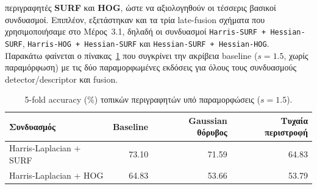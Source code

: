 \documentclass[12pt, a4paper]{article}
\begin{document}
περιγραφητές \textbf{SURF} και \textbf{HOG}, ώστε να αξιολογηθούν οι τέσσερις
βασικοί συνδυασμοί. Επιπλέον, εξετάστηκαν και τα τρία late-fusion σχήματα που
χρησιμοποιήσαμε στο Μέρος~3.1, δηλαδή οι συνδυασμοί
\texttt{Harris-SURF + Hessian-SURF},
\texttt{Harris-HOG + Hessian-SURF} και
\texttt{Hessian-SURF + Hessian-HOG}.\\
Παρακάτω φαίνεται ο πίνακας~\ref{tab:robustness_local} που συγκρίνει την ακρίβεια baseline
($s{=}1.5$, χωρίς παραμόρφωση) με τις δύο παραμορφωμένες εκδόσεις για
όλους τους συνδυασμούς detector/descriptor και fusion. 
 \begin{table}[H]                                                                                                                                                                 
      \centering                                                                                                                                                                   
      \small                                                                                                                                                                       
      \caption{5-fold accuracy (\%) τοπικών περιγραφητών υπό παραμορφώσεις ($s=1.5$).}                                                                                             
      \label{tab:robustness_local}                                                                                                                                                 
      \begin{tabular}{lrrr}                                                                                                                                                        
          \hline                                                                                                                                                                   
          Συνδυασμός & Baseline & Gaussian θόρυβος & Τυχαία περιστροφή \\                                                                                                          
          \hline                                                                                                                                                                   
          Harris-Laplacian + SURF  & 73.10 & 71.59 & 64.83 \\                                                                                                                      
          Harris-Laplacian + HOG   & 64.83 & 53.66 & 53.79 \\                                                                                                                      

\end{tabular}
\end{table}
\end{document}
